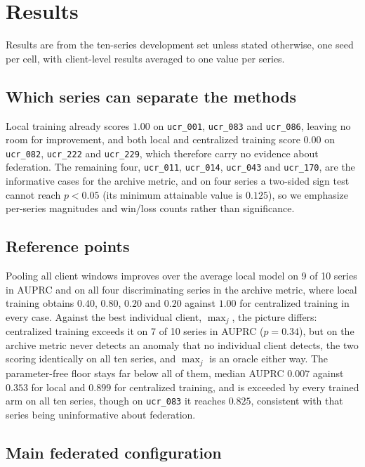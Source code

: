\documentclass[conference]{IEEEtran}
\begin{document}
\section{Results}
\label{sec:results}

Results are from the ten-series development set unless stated otherwise, one seed per cell, with
client-level results averaged to one value per series.

\subsection{Which series can separate the methods}
\label{subsec:discriminating}

Local training already scores $1.00$ on \texttt{ucr\_001}, \texttt{ucr\_083} and \texttt{ucr\_086},
leaving no room for improvement, and both local and centralized training score $0.00$ on
\texttt{ucr\_082}, \texttt{ucr\_222} and \texttt{ucr\_229}, which therefore carry no evidence about
federation. The remaining four, \texttt{ucr\_011}, \texttt{ucr\_014}, \texttt{ucr\_043} and \texttt{ucr\_170},
are the informative cases for the archive metric, and on four series a two-sided sign test cannot
reach $p<0.05$ (its minimum attainable value is $0.125$), so we
emphasize per-series magnitudes and win/loss counts rather than significance.

\subsection{Reference points}
\label{subsec:reference}

Pooling all client windows improves over the average local model on 9 of 10 series in AUPRC and on
all four discriminating series in the archive metric, where local training obtains $0.40$, $0.80$,
$0.20$ and $0.20$ against $1.00$ for centralized training in every case. Against the best individual
client, $\max_j$, the picture differs: centralized training exceeds it on 7 of 10 series in AUPRC ($p=0.34$),
but on the archive metric never detects an anomaly that no individual client detects, the two
scoring identically on all ten series, and $\max_j$ is an oracle either way.
The parameter-free floor stays far below all of them, median AUPRC $0.007$
against $0.353$ for local and $0.899$ for centralized training, and is exceeded by every trained arm
on all ten series, though on \texttt{ucr\_083} it reaches $0.825$, consistent with that series
being uninformative about federation.

\subsection{Main federated configuration}
\label{subsec:main}
\end{document}
